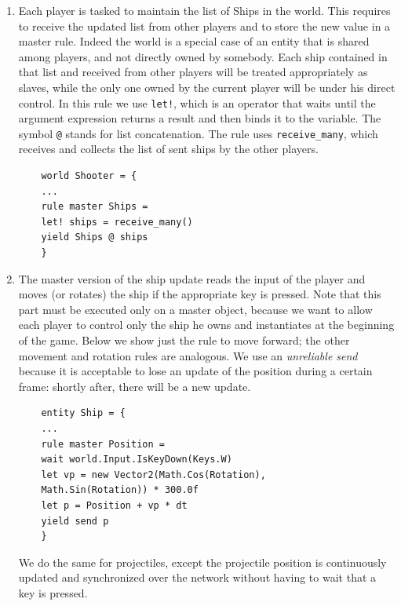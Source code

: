\begin{enumerate}
	\item Each player is tasked to maintain the list of Ships in the world. This requires to receive the updated list from other players and to store the new value in a master rule. Indeed the world is a special case of an entity that is shared among players, and not directly owned by somebody. Each ship contained in that list and received from other players will be treated appropriately as slaves, while the only one owned by the current player will be under his direct control. In this rule we use \texttt{let!}, which is an operator that waits until the argument expression returns a result and then binds it to the variable. The symbol \texttt{@} stands for list concatenation. The rule uses \texttt{receive\_many}, which receives and collects the list of sent ships by the other players.
	
	\begin{lstlisting}
	world Shooter = {
  	...
  	rule master Ships =
  	let! ships = receive_many()
  	yield Ships @ ships
	}
	\end{lstlisting}
	
	\item The master version of the ship update reads the input of the player and moves (or rotates) the ship if the appropriate key is pressed. Note that this part must be executed only on a master object, because we want to allow each player to control only the ship he owns and instantiates at the beginning of the game. Below we show just the rule to move forward; the other movement and rotation rules are analogous. We use an \textit{unreliable send} because it is acceptable to lose an update of the position during a certain frame: shortly after, there will be a new update.
	
	\begin{lstlisting}
	entity Ship = {
	...
	rule master Position =
  	wait world.Input.IsKeyDown(Keys.W)
  	let vp = new Vector2(Math.Cos(Rotation), 
  	Math.Sin(Rotation)) * 300.0f
  	let p = Position + vp * dt
  	yield send p
	}
	\end{lstlisting}
	
	We do the same for projectiles, except the projectile position is continuously updated and synchronized over the network without having to wait that a key is pressed.
	

\end{enumerate}
